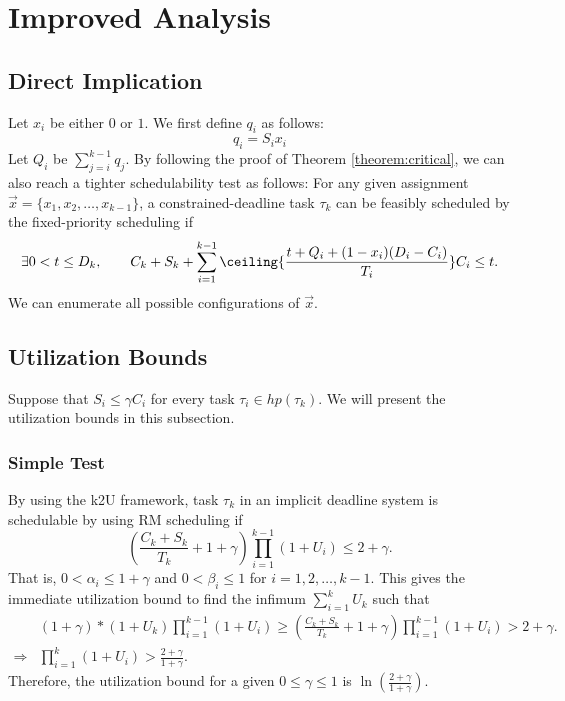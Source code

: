 \section{Improved Analysis}

\subsection{Direct Implication}

Let $x_i$ be either $0$ or $1$. We first define $q_i$ as follows:
\begin{equation}
  \label{eq:qi}
  q_i = S_i x_i
\end{equation}
Let $Q_i$ be $\sum_{j=i}^{k-1} q_j$.  
By following the proof of Theorem \ref{theorem:critical}, we can also reach a tighter schedulability test as follows: For any given assignment $\vec{x} = \{x_1, x_2, \ldots, x_{k-1}\}$, a constrained-deadline task $\tau_k$ can be feasibly scheduled by the fixed-priority scheduling if
\begin{equation} \label{eq:TDA-suspension-tighter} 
\exists 0 < t \leq D_k, \qquad C_k+S_k+ \sum_{i=1}^{k-1}\ceiling{\frac{t+Q_i+(1-x_i)(D_i-C_i)}{T_i}} C_i \leq t.
\end{equation}
We can enumerate all possible configurations of $\vec{x}$.
  
\subsection{Utilization Bounds}
Suppose that $S_i \leq \gamma C_i$ for every task $\tau_i \in hp(\tau_k)$. We will present the utilization bounds in this subsection. 

\subsubsection{Simple Test}

By using the k2U framework, task $\tau_k$ in an implicit deadline system is schedulable by using RM scheduling if
\[
(\frac{C_k + S_k}{ T_k}+1+\gamma) \prod_{i=1}^{k-1}(1+U_i) \leq 2+\gamma.
\]
That is, $0 < \alpha_i \leq  1+\gamma$ and $0 < \beta_i \leq 1$ for $i=1,2,\ldots,k-1$.
This gives the immediate utilization bound to find the infimum $\sum_{i=1}^{k} U_k$ such that
\begin{align*}
& (1+\gamma)*(1+U_k) \prod_{i=1}^{k-1}(1+U_i) \geq  (\frac{C_k + S_k}{ T_k}+1+\gamma) \prod_{i=1}^{k-1}(1+U_i) > 2+\gamma.\\
\Rightarrow & \prod_{i=1}^{k}(1+U_i) > \frac{2+\gamma}{1+\gamma}.
\end{align*}
Therefore, the utilization bound for a given $0 \leq \gamma \leq 1$  is $\ln(\frac{2+\gamma}{1+\gamma})$.
  
  
  
  
  
  
  
  
  
  
  
  
  
  
  
  